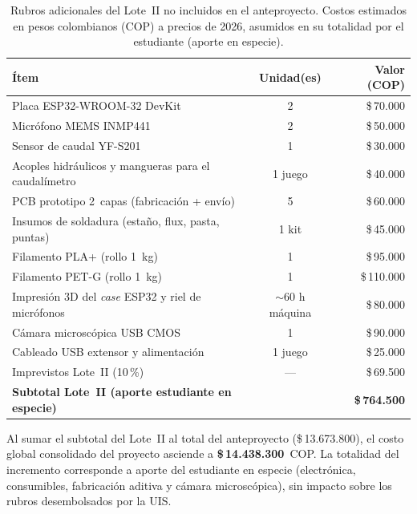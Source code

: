 \documentclass[12pt, letterpaper]{report}
\begin{document}
\begin{table}[htbp]
\centering
\small
\caption{Rubros adicionales del Lote~II no incluidos en el anteproyecto. Costos estimados en pesos colombianos (COP) a precios de 2026, asumidos en su totalidad por el estudiante (aporte en especie).}
\label{tab:presupuesto-art2}
\begin{tabularx}{\textwidth}{X c r}
\toprule
\'{I}tem & Unidad(es) & Valor (COP) \\
\midrule
Placa ESP32-WROOM-32 DevKit & 2 & \$\,70.000 \\
Micr\'{o}fono MEMS INMP441 & 2 & \$\,50.000 \\
Sensor de caudal YF-S201 & 1 & \$\,30.000 \\
Acoples hidr\'{a}ulicos y mangueras para el caudal\'{i}metro & 1 juego & \$\,40.000 \\
PCB prototipo 2~capas (fabricaci\'{o}n + env\'{i}o) & 5 & \$\,60.000 \\
Insumos de soldadura (esta\~{n}o, flux, pasta, puntas) & 1 kit & \$\,45.000 \\
Filamento PLA+ (rollo 1~kg) & 1 & \$\,95.000 \\
Filamento PET-G (rollo 1~kg) & 1 & \$\,110.000 \\
Impresi\'{o}n 3D del \textit{case} ESP32 y riel de micr\'{o}fonos & $\sim$60 h m\'{a}quina & \$\,80.000 \\
C\'{a}mara microsc\'{o}pica USB CMOS & 1 & \$\,90.000 \\
Cableado USB extensor y alimentaci\'{o}n & 1 juego & \$\,25.000 \\
Imprevistos Lote~II (10\,\%) & --- & \$\,69.500 \\
\midrule
\textbf{Subtotal Lote~II (aporte estudiante en especie)} & & \textbf{\$\,764.500} \\
\bottomrule
\end{tabularx}
\end{table}

Al sumar el subtotal del Lote~II al total del anteproyecto (\$\,13.673.800), el costo global consolidado del proyecto asciende a \textbf{\$\,14.438.300}~COP. La totalidad del incremento corresponde a aporte del estudiante en especie (electr\'{o}nica, consumibles, fabricaci\'{o}n aditiva y c\'{a}mara microsc\'{o}pica), sin impacto sobre los rubros desembolsados por la UIS.

\clearpage
{}
\nocite{*}

\end{document}
